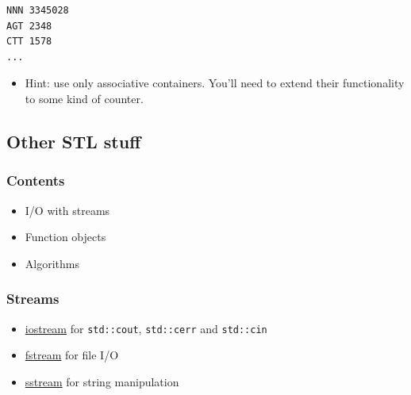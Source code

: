 \begin{verbatim}
NNN 3345028
AGT 2348
CTT 1578
...
\end{verbatim}

\begin{itemize}
\itemsep1pt\parskip0pt
\item
  Hint: use only associative containers. You'll need to extend their
  functionality to some kind of counter.
\end{itemize}

\subsection{Other STL stuff}\label{other-stl-stuff}

\subsubsection{Contents}\label{contents-1}

\begin{itemize}
\itemsep1pt\parskip0pt
\item
  I/O with streams
\item
  Function objects
\item
  Algorithms
\end{itemize}

\subsubsection{Streams}\label{streams}

\begin{itemize}
\itemsep1pt\parskip0pt
\item
  \href{http://www.cplusplus.com/reference/iostream/}{iostream} for
  \texttt{std::cout}, \texttt{std::cerr} and \texttt{std::cin}
\item
  \href{http://www.cplusplus.com/reference/fstream/}{fstream} for file
  I/O
\item
  \href{http://www.cplusplus.com/reference/sstream/}{sstream} for string
  manipulation
\end{itemize}

\begin{Shaded}
\begin{Highlighting}[]
 
     
    
\NormalTok{\}}

 \NormalTok{[m_size];}
\end{Highlighting}
\end{Shaded}

